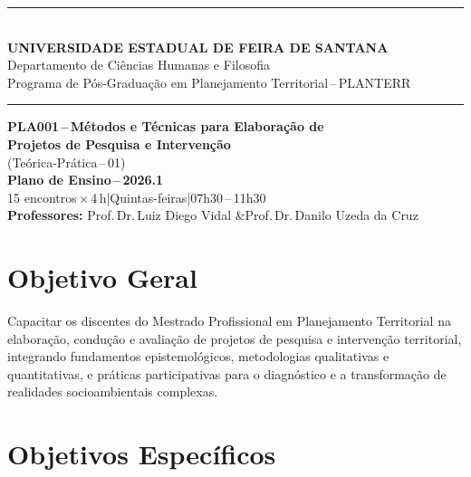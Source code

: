 \documentclass[11pt,a4paper]{article}
\begin{document}
\thispagestyle{empty}

\begin{center}
\color{uefsdark}\rule{\textwidth}{1.2pt}\\[0.35cm]
{\Large\bfseries UNIVERSIDADE ESTADUAL DE FEIRA DE SANTANA}\\[0.20cm]
{\normalsize Departamento de Ciências Humanas e Filosofia}\\[0.08cm]
{\normalsize Programa de Pós-Graduação em Planejamento Territorial\,--\,PLANTERR}\\[0.20cm]
\color{uefsdark}\rule{\textwidth}{1.2pt}
\end{center}

\vspace{0.8cm}

\begin{center}
{\LARGE\bfseries\color{uefsdark} PLA001\,--\,Métodos e Técnicas para Elaboração de\\Projetos de Pesquisa e Intervenção}\\[0.35cm]
{\large (Teórica-Prática\,--\,01)}\\[0.60cm]
{\Large\bfseries Plano de Ensino\,--\,2026.1}\\[0.30cm]
{\normalsize 15 encontros\,$\times$\,4\,h\enspace|\enspace Quintas-feiras\enspace|\enspace 07h30\,--\,11h30}\\[0.80cm]
{\normalsize\textbf{Professores:} Prof.\,Dr.\,Luiz Diego Vidal \enspace\&\enspace Prof.\,Dr.\,Danilo Uzeda da Cruz}
\end{center}

\vspace{0.6cm}

\section*{Objetivo Geral}

Capacitar os discentes do Mestrado Profissional em Planejamento Territorial na elaboração, condução e avaliação de projetos de pesquisa e intervenção territorial, integrando fundamentos epistemológicos, metodologias qualitativas e quantitativas, e práticas participativas para o diagnóstico e a transformação de realidades socioambientais complexas.

\section*{Objetivos Específicos}
\end{document}
